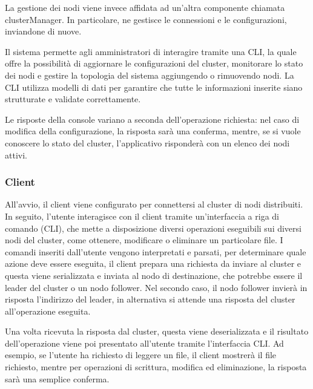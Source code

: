 La gestione dei nodi viene invece affidata ad un'altra componente chiamata clusterManager. 
In particolare, ne gestisce le connessioni e le configurazioni, inviandone di nuove. 

Il sistema permette agli amministratori di interagire tramite una CLI, la quale offre la 
possibilità di aggiornare le configurazioni del cluster, monitorare lo stato dei nodi e gestire 
la topologia del sistema aggiungendo o 
rimuovendo nodi. La CLI utilizza modelli di dati per garantire che tutte le informazioni inserite 
siano strutturate e validate correttamente.

Le risposte della console variano a seconda dell'operazione richiesta: nel caso di modifica della 
configurazione, la risposta sarà una conferma, mentre, se si vuole conoscere lo stato del cluster, 
l'applicativo risponderà con un elenco dei nodi attivi.

\subsubsection{Client}
All'avvio, il client viene configurato per connettersi al cluster di nodi distribuiti. In seguito, 
l'utente interagisce con il client tramite un'interfaccia a riga di comando (CLI), che mette a 
disposizione diversi operazioni eseguibili sui diversi nodi del cluster, come ottenere, modificare 
o eliminare un particolare file. I comandi inseriti dall'utente vengono interpretati e parsati, 
per determinare quale azione deve essere eseguita, il client prepara una richiesta da inviare al 
cluster e questa viene serializzata e inviata al nodo di destinazione, che potrebbe essere il 
leader del cluster o un nodo follower. Nel secondo caso, il nodo follower invierà in risposta 
l'indirizzo del leader, in alternativa si attende una risposta del cluster all'operazione eseguita.

Una volta ricevuta la risposta dal cluster, questa viene deserializzata e il risultato 
dell'operazione viene poi presentato all'utente tramite l'interfaccia CLI. Ad esempio, se l'utente 
ha richiesto di leggere un file, il client mostrerà il file richiesto, mentre per operazioni di 
scrittura, modifica ed eliminazione, la risposta sarà una semplice conferma.


